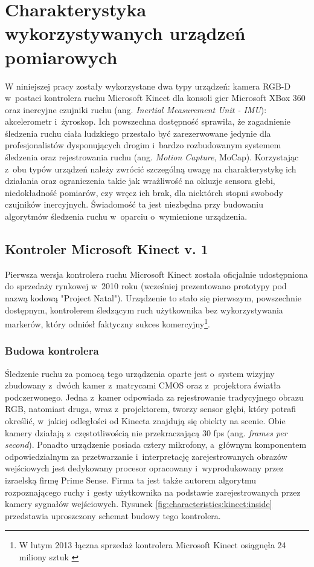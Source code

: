\section{Charakterystyka wykorzystywanych urządzeń pomiarowych}\label{chap:characteristics}
W niniejszej pracy zostały wykorzystane dwa typy urządzeń: kamera RGB-D w~postaci kontrolera ruchu Microsoft Kinect dla konsoli gier Microsoft XBox 360 oraz inercyjne czujniki ruchu (ang. \emph{Inertial Measurement Unit - IMU}): akcelerometr i~żyroskop. Ich powszechna dostępność sprawiła, że zagadnienie śledzenia ruchu ciała ludzkiego przestało być zarezerwowane jedynie dla profesjonalistów dysponujących drogim i~bardzo rozbudowanym systemem śledzenia oraz rejestrowania ruchu (ang. \emph{Motion Capture}, MoCap). Korzystając z~obu typów urządzeń należy zwrócić szczególną uwagę na charakterystykę ich działania oraz ograniczenia takie jak wrażliwość na okluzje sensora głebi, niedokładność pomiarów, czy wręcz ich brak, dla niektórch stopni swobody czujników inercyjnych. Świadomość ta jest niezbędna przy budowaniu algorytmów śledzenia ruchu w~oparciu o~wymienione urządzenia. 
		
\subsection{Kontroler Microsoft Kinect v. 1}\label{sec:characteristics:kinect}
Pierwsza wersja kontrolera ruchu Microsoft Kinect została oficjalnie udostępniona do sprzedaży rynkowej w~2010 roku (wcześniej prezentowano prototypy pod nazwą kodową "Project Natal"). Urządzenie to stało się pierwszym, powszechnie dostępnym, kontrolerem śledzącym ruch użytkownika bez wykorzystywania markerów, który odniósł faktyczny sukces komercyjny\footnote{W lutym 2013 łączna sprzedaż kontrolera Microsoft Kinect osiągnęła 24 miliony sztuk \cite{kinectSales2013}}.  
		
\subsubsection*{Budowa kontrolera}
Śledzenie ruchu za pomocą tego urządzenia oparte jest o~system wizyjny zbudowany z~dwóch kamer z~matrycami CMOS oraz z~projektora światła podczerwonego. Jedna z~kamer odpowiada za rejestrowanie tradycyjnego obrazu RGB, natomiast druga, wraz z~projektorem, tworzy sensor głębi, który potrafi określić, w~jakiej odległości od Kinecta znajdują się obiekty na scenie. Obie kamery działają z~częstotliwością nie przekraczającą 30 fps (ang. \textsl{frames per second}). Ponadto urządzenie posiada cztery mikrofony, a~głównym komponentem odpowiedzialnym za przetwarzanie i~interpretację zarejestrowanych obrazów wejściowych jest dedykowany procesor opracowany i~wyprodukowany przez izraelską firmę Prime Sense. Firma ta jest także autorem algorytmu rozpoznającego ruchy i~gesty użytkownika na podstawie zarejestrowanych przez kamery sygnałów wejściowych. Rysunek \ref{fig:characteristics:kinect:inside} przedstawia uproszczony schemat budowy tego kontrolera. 
		
